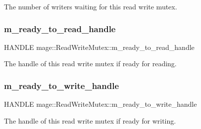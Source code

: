 The number of writers waiting for this read write mutex. \hypertarget{structmage_1_1_read_write_mutex_a65c0ef8b687d48104b09a9d175e72236}{}\label{structmage_1_1_read_write_mutex_a65c0ef8b687d48104b09a9d175e72236} 
\subsubsection{\texorpdfstring{m\+\_\+ready\+\_\+to\+\_\+read\+\_\+handle}{m\_ready\_to\_read\_handle}}
{\footnotesize\ttfamily H\+A\+N\+D\+LE mage\+::\+Read\+Write\+Mutex\+::m\+\_\+ready\+\_\+to\+\_\+read\+\_\+handle\hspace{0.3cm}{\ttfamily [private]}}

The handle of this read write mutex if ready for reading. \hypertarget{structmage_1_1_read_write_mutex_a9498ef85b52486342ba657f34369f89e}{}\label{structmage_1_1_read_write_mutex_a9498ef85b52486342ba657f34369f89e} 
\subsubsection{\texorpdfstring{m\+\_\+ready\+\_\+to\+\_\+write\+\_\+handle}{m\_ready\_to\_write\_handle}}
{\footnotesize\ttfamily H\+A\+N\+D\+LE mage\+::\+Read\+Write\+Mutex\+::m\+\_\+ready\+\_\+to\+\_\+write\+\_\+handle\hspace{0.3cm}{\ttfamily [private]}}

The handle of this read write mutex if ready for writing. 
